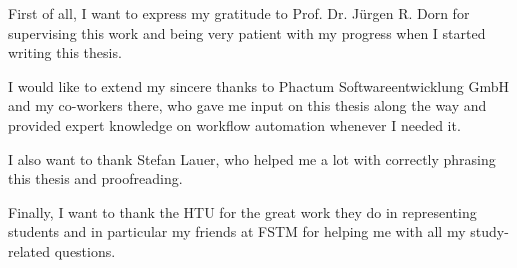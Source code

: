 \begin{acknowledgements*}
First of all, I want to express my gratitude to Prof. Dr. Jürgen R. Dorn for supervising this work and being very patient with my progress when I started writing this thesis.

I would like to extend my sincere thanks to Phactum Softwareentwicklung GmbH and my co-workers there, who gave me input on this thesis along the way and provided expert knowledge on workflow automation whenever I needed it.

I also want to thank Stefan Lauer, who helped me a lot with correctly phrasing this thesis and proofreading. 

Finally, I want to thank the HTU for the great work they do in representing students and in particular my friends at FSTM for helping me with all my study-related questions.
\end{acknowledgements*}